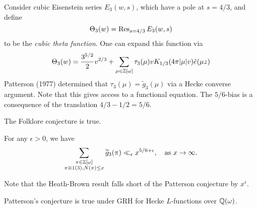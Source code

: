 \begin{example}
  Consider cubic Eisenstein series $E_3(w, s)$, which
  have a pole at $s = 4 / 3$, and define
  \[
    \Theta_3(w) = \operatorname{Res}_{s = 4 / 3} E_3(w, s)
  \]
  to be the \emph{cubic theta function}.
  One can expand this function via
  \[
    \Theta_3(w) = \frac{3^{5 / 2}}{2} v^{2 / 3}
    + \sum_{\mu \in \mathbb{Z}[\omega]} \tau_3(\mu) v K_{1 / 3} (4\pi |\mu| v) \check{e}(\mu z)
  \]
  Patterson (1977) determined that $\tau_3(\mu) = \widetilde{g}_3(\mu)$
  via a Hecke converse argument. Note that this
  gives access to a functional equation.
  The $5 / 6$-bias is a consequence of the
  translation $4 / 3 - 1 / 2 = 5 / 6$.
\end{example}

\begin{theorem}
  The Folklore conjecture is true.
\end{theorem}

\begin{theorem}
  For any $\epsilon > 0$, we have
  \[
    \sum_{\substack{\pi \in \mathbb{Z}[\omega] \\ \pi \equiv 1 (3), N(\pi) \le x}} \widetilde{g}_3(\pi)
    \ll_{\epsilon} x^{5 / 6 + \epsilon}, \quad
    \text{as $x \to \infty$}.
  \]
\end{theorem}

\begin{remark}
  Note that the Heath-Brown result falls short
  of the Patterson conjecture by $x^\epsilon$.
\end{remark}

\begin{theorem}
  Patterson's conjecture is true under GRH
  for Hecke $L$-functions over $\mathbb{Q}(\omega)$.
\end{theorem}

